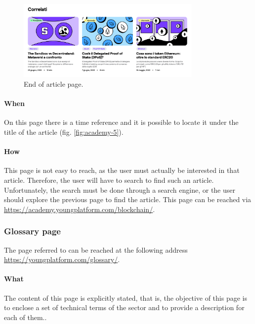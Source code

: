 \begin{figure}[H]
  \centering
  \includegraphics[width=0.80\textwidth]{res/images/internal-pages/academy/academy-7.png}
  \caption{End of article page.}
  \label{fig:academy-7}
\end{figure}

\paragraph{When}

On this page there is a time reference and it is possible to locate it 
under the title of the article (fig. \ref{fig:academy-5}).

\paragraph{How}

This page is not easy to reach, as the user must actually be interested in 
that article. Therefore, the user will have to search to find such an 
article. Unfortunately, the search must be done through a search engine, 
or the user should explore the previous page to find the article. This 
page can be reached via 
\href{https://academy.youngplatform.com/blockchain/}{https://academy.youngplatform.com/blockchain/}.

\subsubsection{Glossary page}

The page referred to can be reached at the following address 
\href{https://youngplatform.com/glossary/}{https://youngplatform.com/glossary/}.

\paragraph{What}

The content of this page is explicitly stated, that is, the objective of 
this page is to enclose a set of technical terms of the sector and to 
provide a description for each of them.. 

